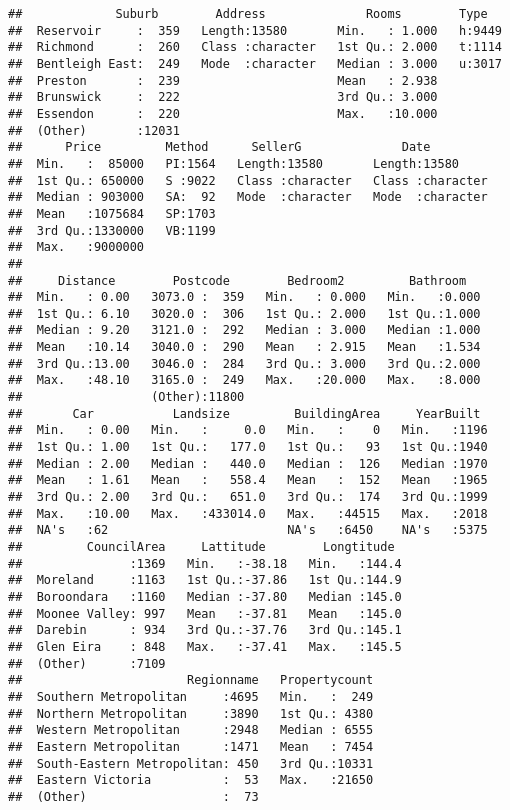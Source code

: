 \documentclass[]{article}
\begin{document}
\begin{verbatim}
##             Suburb        Address              Rooms        Type    
##  Reservoir     :  359   Length:13580       Min.   : 1.000   h:9449  
##  Richmond      :  260   Class :character   1st Qu.: 2.000   t:1114  
##  Bentleigh East:  249   Mode  :character   Median : 3.000   u:3017  
##  Preston       :  239                      Mean   : 2.938           
##  Brunswick     :  222                      3rd Qu.: 3.000           
##  Essendon      :  220                      Max.   :10.000           
##  (Other)       :12031                                               
##      Price         Method      SellerG              Date          
##  Min.   :  85000   PI:1564   Length:13580       Length:13580      
##  1st Qu.: 650000   S :9022   Class :character   Class :character  
##  Median : 903000   SA:  92   Mode  :character   Mode  :character  
##  Mean   :1075684   SP:1703                                        
##  3rd Qu.:1330000   VB:1199                                        
##  Max.   :9000000                                                  
##                                                                   
##     Distance        Postcode        Bedroom2         Bathroom    
##  Min.   : 0.00   3073.0 :  359   Min.   : 0.000   Min.   :0.000  
##  1st Qu.: 6.10   3020.0 :  306   1st Qu.: 2.000   1st Qu.:1.000  
##  Median : 9.20   3121.0 :  292   Median : 3.000   Median :1.000  
##  Mean   :10.14   3040.0 :  290   Mean   : 2.915   Mean   :1.534  
##  3rd Qu.:13.00   3046.0 :  284   3rd Qu.: 3.000   3rd Qu.:2.000  
##  Max.   :48.10   3165.0 :  249   Max.   :20.000   Max.   :8.000  
##                  (Other):11800                                   
##       Car           Landsize         BuildingArea     YearBuilt   
##  Min.   : 0.00   Min.   :     0.0   Min.   :    0   Min.   :1196  
##  1st Qu.: 1.00   1st Qu.:   177.0   1st Qu.:   93   1st Qu.:1940  
##  Median : 2.00   Median :   440.0   Median :  126   Median :1970  
##  Mean   : 1.61   Mean   :   558.4   Mean   :  152   Mean   :1965  
##  3rd Qu.: 2.00   3rd Qu.:   651.0   3rd Qu.:  174   3rd Qu.:1999  
##  Max.   :10.00   Max.   :433014.0   Max.   :44515   Max.   :2018  
##  NA's   :62                         NA's   :6450    NA's   :5375  
##         CouncilArea     Lattitude        Longtitude   
##               :1369   Min.   :-38.18   Min.   :144.4  
##  Moreland     :1163   1st Qu.:-37.86   1st Qu.:144.9  
##  Boroondara   :1160   Median :-37.80   Median :145.0  
##  Moonee Valley: 997   Mean   :-37.81   Mean   :145.0  
##  Darebin      : 934   3rd Qu.:-37.76   3rd Qu.:145.1  
##  Glen Eira    : 848   Max.   :-37.41   Max.   :145.5  
##  (Other)      :7109                                   
##                       Regionname   Propertycount  
##  Southern Metropolitan     :4695   Min.   :  249  
##  Northern Metropolitan     :3890   1st Qu.: 4380  
##  Western Metropolitan      :2948   Median : 6555  
##  Eastern Metropolitan      :1471   Mean   : 7454  
##  South-Eastern Metropolitan: 450   3rd Qu.:10331  
##  Eastern Victoria          :  53   Max.   :21650  
##  (Other)                   :  73
\end{verbatim}
\end{document}
